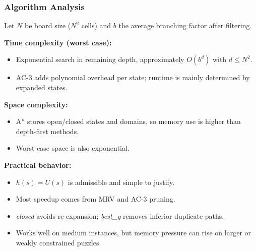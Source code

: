 \subsubsection{Algorithm Analysis}
Let \(N\) be board size (\(N^2\) cells) and \(b\) the average branching factor after filtering.

\textbf{Time complexity (worst case):}
\begin{itemize}
\item Exponential search in remaining depth, approximately \(O(b^d)\) with \(d \le N^2\).
\item AC-3 adds polynomial overhead per state; runtime is mainly determined by expanded states.
\end{itemize}

\textbf{Space complexity:}
\begin{itemize}
\item A* stores open/closed states and domains, so memory use is higher than depth-first methods.
\item Worst-case space is also exponential.
\end{itemize}

\textbf{Practical behavior:}
\begin{itemize}
\item \(h(s)=U(s)\) is admissible and simple to justify.
\item Most speedup comes from MRV and AC-3 pruning.
\item \textit{closed} avoids re-expansion; \textit{best\_g} removes inferior duplicate paths.
\item Works well on medium instances, but memory pressure can rise on larger or weakly constrained puzzles.
\end{itemize}

